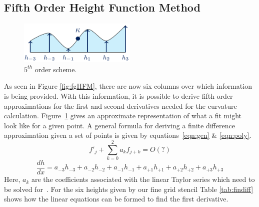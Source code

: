  
 \subsection{Fifth Order Height Function Method}

\begin{figure}[htbp]
	\centering
	\includegraphics[width=0.5\textwidth]{figs/5thorder.png}
	\caption{$5^{th}$ order scheme.}
	\label{fig:5th} 
\end{figure} 

As seen in Figure \ref{fig:fgHFM}, there are now six columns over which information is being provided. With this information, it is possible to derive fifth order approximations for the first and second derivatives needed for the curvature calculation. Figure~\ref{fig:5th} gives an approximate representation of what a fit might look like for a given point. A general formula for deriving a finite difference approximation given a set of points is given by equations~\ref{eqn:gen}  \& \ref{eqn:poly}. 
\begin{equation}
f'_j + \sum_{k=0}^{2} a_k f_{j+k} = O(?)
\label{eqn:gen}
\end{equation}
\begin{equation}
\frac{dh}{dx} = a_{-3}h_{-3} +a_{-2}h_{-2} + a_{-1}h_{-1} + a_{+1}h_{+1} + a_{+2}h_{+2} + a_{+3}h_{+3} 
\label{eqn:poly}
\end{equation}
\noindent Here, $a_k$ are the coefficients associated with the linear Taylor series which need to be solved for~\cite{moin}. For the six heights given by our fine grid stencil Table \ref{tab:findiff} shows how the linear equations can be formed to find the first derivative.


